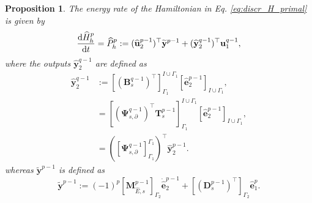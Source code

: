 \documentclass{elsarticle}
\newtheorem{proposition}{Proposition}
\newcommand*{\dual}[1]{\ensuremath{\widehat{#1}}}
\begin{document}
{\begin{proposition}\label{pr:discr_dotH_primal}
The energy rate of the Hamiltonian in Eq. \eqref{eq:discr_H_primal} is given by  
\begin{equation}\label{eq:discr_dotH_primal}
    \diff{\dual{H}_h^{p}}{t} = \dual{P}_h^p:= (\dual{\mathbf{u}}^{p-1}_2)^\top \widetilde{\mathbf{y}}^{p-1} + (\dual{\mathbf{y}}^{q-1}_2)^\top \mathbf{u}^{q-1}_1, 
\end{equation} 
where the outputs $\widehat{\mathbf{y}}^{q-1}_2$  are defined as
\begin{equation}\label{eq:alg_hat_y_primal}
\begin{aligned}
    \widehat{\mathbf{y}}^{q-1}_2 &:= [(\mathbf{B}^{q-1}_{s})^\top]^{I \cup \Gamma_1}_{\Gamma_1} [\dual{\mathbf{e}}^{p-1}_2]_{I \cup \Gamma_1}, \\
    &=  [(\mathbf{\Psi}^{q-1}_{s, \partial})^\top \mathbf{T}_s^{p-1}]^{I \cup \Gamma_1}_{\Gamma_1} [\dual{\mathbf{e}}^{p-1}_2]_{I \cup \Gamma_1}, \\
    &=  ([\mathbf{\Psi}^{q-1}_{s, \partial}]^{\Gamma_1}_{\Gamma_1})^\top \dual{\mathbf{y}}^{p-1}_2.
\end{aligned}
\end{equation} 
whereas $\widetilde{\mathbf{y}}^{p-1}$ is defined as
\begin{equation} \label{eq:alg_til_y_primal} 
    \widetilde{\mathbf{y}}^{p-1} :=  (-1)^p[\mathbf{M}^{p-1}_{\dual{E}, s}]_{\Gamma_2} \dot{\dual{\mathbf{e}}}^{p-1}_2  +[(\mathbf{D}_{s}^{p-1})^\top]_{\Gamma_2} \dual{\mathbf{e}}^p_1.  
\end{equation}
\end{proposition}

}
\end{document}
